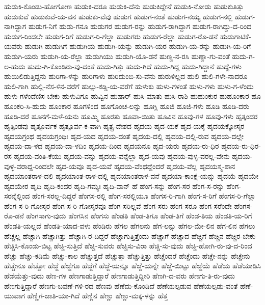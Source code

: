 ಹುಡುಕಿ-ಕೊಂಡು-ಹೋಗೋಣ
ಹುಡುಕಿ-ದರೂ
ಹುಡುಕಿ-ದೆನು
ಹುಡುಕಿದ್ದೇನೆ
ಹುಡುಕಿ-ನೋಡು
ಹುಡುಕುತಿತ್ತು
ಹುಡುಕುವೆ
ಹುಡುಕುವೆ-ಯ-ವನ
ಹುಡುಕು-ವೆವು
ಹುಡುಗ
ಹುಡುಗ-ನಂತೆ
ಹುಡುಗ-ನಯ್ಯ
ಹುಡುಗ-ನಲ್ಲಿ
ಹುಡುಗ-ನಾಗಿದ್ದಾಗ
ಹುಡುಗ-ನಿಗೆ
ಹುಡು-ಗನೂ
ಹುಡುಗರ
ಹುಡುಗ-ರನ್ನು
ಹುಡುಗ-ರಾಗಿದ್ದಾಗ
ಹುಡುಗ-ರಾಗಿದ್ದು-ದ-ರಿಂದ
ಹುಡುಗ-ರಿಂದಲೇ
ಹುಡುಗ-ರಿಗೆ
ಹುಡುಗ-ರಿ-ಗೆಲ್ಲಾ
ಹುಡುಗರು
ಹುಡುಗ-ರೆಲ್ಲಾ
ಹುಡುಗ-ರೊ-ಡನೆ
ಹುಡುಗಾಟಿಕೆ-ಯವರು
ಹುಡುಗಿ
ಹುಡುಗಿಗೆ
ಹುಡುಗಿಯ
ಹುಡುಗಿ-ಯನ್ನು
ಹುಡುಗಿ-ಯರ
ಹುಡುಗಿ-ಯ-ರನ್ನು
ಹುಡುಗಿ-ಯ-ರಿಗೆ
ಹುಡುಗಿ-ಯರು
ಹುಡುಗಿ-ಯ-ರೆಲ್ಲಾ
ಹುಡುಗಿಯು
ಹುಡುಗಿ-ಯೊ-ಡನೆ
ಹುಣ್ಣ-ನ-ರಸಿ
ಹುಣ್ಣಾ-ಗು-ವಂತೆ
ಹುದು-ಗ-ಲ-ಹುದು
ಹುದು-ಗಿ-ಕೊಂಡಿರು-ವು-ದಂತೆ
ಹುದು-ಗಿತ್ತು
ಹುದು-ಗಿದೆ
ಹುದು-ಗಿದ್ದ
ಹುದು-ಗಿದ್ದಾನೆ
ಹುದ್ದೆ-ಗಳು
ಹುಯಿಲಿಡುತ್ತಿದ್ದನು
ಹುರಿಗಾ-ಳನ್ನು
ಹುರಿಗಾಳು
ಹುರಿದುಂಬಿ-ಸು-ವೆನು
ಹುರುಳಿಲ್ಲದ
ಹುಲಿ
ಹುಲಿ-ಗಳೇ-ನಾದರೂ
ಹುಲಿ-ಗಾಗಿ
ಹುಲ್ಲಿ-ನೆಸ-ಳಿನ-ವರೆಗೆ
ಹುಲ್ಲು-ಕಡ್ಡಿ-ಯ-ವರೆಗೆ
ಹುಳುಕು
ಹುಳು-ಗಳಂತೆ
ಹುಳು-ಗಳು
ಹುಳು-ಗ-ಳೆಂದು
ಹುಳು-ಗಳೆಂದೆಣಿಸ-ಬೇಕು
ಹುಳುವಿಗೂ
ಹುವ್ವಿನ
ಹುಷಾರ್
ಹುಸಿ-ಮಾತು
ಹುಸಿ-ರಾಶಿ
ಹುಹುಂಕುರ
ಹುಹೂಂಕಾರ
ಹೂ
ಹೂಂಕರಿ-ಸಿ-ಹುದು
ಹೂಂಕಾರ
ಹೂಗಳಿಂದ
ಹೂಗೊಂಚ-ಲನ್ನು
ಹೂಗ್ಲಿ
ಹೂಜಿ
ಹೂಜಿ-ಗಳು
ಹೂಡಿ
ಹೂಡಿ-ದರು
ಹೂಡಿ-ದರೆ
ಹೂನಗೆ-ಮಳೆ-ಯನು
ಹೂಮ್ಮಿ
ಹೂರತು
ಹೂವಾ-ಯಿತು
ಹೂವಿನ
ಹೂವು-ಗಳ
ಹೂವು-ಗಳು
ಹೃತ್ಕಂದರ
ಹೃತ್ಪಿಂಡವು
ಹೃತ್ಪೂರ್ವಕ
ಹೃತ್ಪೂರ್ವ-ಕ-ವಾಗಿ
ಹೃತ್ಪ್ರ-ದೇಶದ
ಹೃದಯ
ಹೃದ-ಯಕೆ
ಹೃದ-ಯಕ್ಕೆ
ಹೃದಯಕ್ಕೋಸ್ಕರ
ಹೃದಯಗ್ರಂಥ
ಹೃದಯಗ್ರಂಥಿಃ
ಹೃದ-ಯದ
ಹೃದಯ-ದಂತೆ
ಹೃದಯ-ದಲ್ಲಿ
ಹೃದಯ-ದಲ್ಲಿ-ರುವ
ಹೃದಯ-ದಲ್ಲೇ
ಹೃದಯ-ದಾ-ಳದ
ಹೃದಯ-ದಾ-ಳದಿಂ
ಹೃದಯ-ದಿಂದ
ಹೃದಯನೂ
ಹೃದ-ಯರು
ಹೃದಯ-ರು-ಧಿರ
ಹೃದಯ-ರು-ಧಿರ-ರಸ
ಹೃದಯ-ವಂತಿ-ಕೆಯು
ಹೃದಯ-ವನ್ನು
ಹೃದಯ-ವನ್ನೆಲ್ಲಾ
ಹೃದ-ಯವು
ಹೃದಯ-ವುಳ್ಳ-ವರಲ್ಲ-ವೇನು
ಹೃದಯ-ವುಳ್ಳ-ವರಾದ್ದ-ರಿಂದಲೇ
ಹೃದ-ಯವೂ
ಹೃದ-ಯವೆ
ಹೃದಯ-ವೆಂಥದ್ದೆಂದರೆ
ಹೃದಯ-ವೆಲ್ಲ
ಹೃದಯಸ್ಮ-ಶಾನ
ಹೃದಯಾಂತರಾಳ-ದಲಿ
ಹೃದಯಾಂತ-ರಾಳ-ದಲ್ಲಿ
ಹೃದಯಾಂತರಾಳ-ವನೆ
ಹೃದಯಾ-ಕಾಂಕ್ಷೆ-ಯನ್ನು
ಹೃದಯೆ
ಹೃದಯೇ
ಹೃದಯೇರ
ಹೃದಿ
ಹೃದಿ-ಕಂದರ
ಹೃದಿ-ಗಮ್ಯಃ
ಹೃದಿ-ವಾನ್
ಹೆ
ಹೆಂಗ-ಸನ್ನು
ಹೆಂಗ-ಸರ
ಹೆಂಗ-ಸ-ರನ್ನು
ಹೆಂಗ-ಸರನ್ನೆಲ್ಲಿಂದ
ಹೆಂಗ-ಸರಲ್ಲ-ದಿದ್ದರೆ
ಹೆಂಗಸ-ರಲ್ಲಿ
ಹೆಂಗ-ಸರಲ್ಲಿಯೂ
ಹೆಂಗಸ-ರಿ-ಗಾಗಿ
ಹೆಂಗ-ಸ-ರಿಗೆ
ಹೆಂಗಸ-ರಿ-ಗೆಲ್ಲಾ
ಹೆಂಗ-ಸ-ರಿ-ಗೋಸ್ಕರ
ಹೆಂಗ-ಸ-ರಿ-ಗೋಸ್ಕರವೂ
ಹೆಂಗ-ಸರಿಲ್ಲವೆ
ಹೆಂಗ-ಸರು
ಹೆಂಗ-ಸರೂ
ಹೆಂಗ-ಸರೆಂದೇ
ಹೆಂಗಸ-ರೊ-ಡನೆ
ಹೆಂಗಸಾಗು-ವುದು
ಹೆಂಗಸಿನ
ಹೆಂಗಸು
ಹೆಂಡತಿ
ಹೆಂಡ-ತಿಗೂ
ಹೆಂಡ-ತಿಗೆ
ಹೆಂಡ-ತಿಯ
ಹೆಂಡತಿ-ಯ-ರಿಗೆ
ಹೆಂಡತಿ-ಯಲ್ಲದೆ
ಹೆಂಡತಿ-ಯಾದ-ವಳು
ಹೆಂಡಿರು
ಹೆಗಲ
ಹೆಗಲನು
ಹೆಗ-ಲನ್ನು
ಹೆಗಲ-ಮೇ-ಲಿನ
ಹೆಗ-ಲಿನ
ಹೆಗಲು
ಹೆಚ್ಚಲ್ಲ
ಹೆಚ್ಚಾಗಿ
ಹೆಚ್ಚಾಗಿತ್ತು
ಹೆಚ್ಚಾಗಿ-ರ-ದಿದ್ದರೆ
ಹೆಚ್ಚಾಗುತ್ತಿತ್ತೆಂದು
ಹೆಚ್ಚಾಗೆ
ಹೆಚ್ಚಾದ
ಹೆಚ್ಚಿಗೆ
ಹೆಚ್ಚಿನ
ಹೆಚ್ಚಿರ-ಬೇಕು
ಹೆಚ್ಚಿಸಿ-ಕೊಂಡು-ಬಿಟ್ಟ
ಹೆಚ್ಚಿ-ಸುತ್ತಿದೆ
ಹೆಚ್ಚಿ-ಸುವರು
ಹೆಚ್ಚಿಸು-ವಿರಾ
ಹೆಚ್ಚಿ-ಸು-ವುದು
ಹೆಚ್ಚಿ-ಹೋಗಿ-ರು-ವು-ದ-ರಿಂದ
ಹೆಚ್ಚು
ಹೆಚ್ಚು-ಕಡಿಮೆ
ಹೆಚ್ಚು-ಕಾಲ
ಹೆಚ್ಚುತ್ತದೆ
ಹೆಚ್ಚುತ್ತಾ
ಹೆಚ್ಚುತ್ತಿತ್ತು
ಹೆಚ್ಚೆಂದರೆ
ಹೆಚ್ಚೆಂದು
ಹೆಚ್ಚೇ-ನನ್ನು
ಹೆಚ್ಚೇನು
ಹೆಚ್ಚೇನೂ
ಹೆಚ್ಚೋ
ಹೆಜ್ಜೆ
ಹೆಜ್ಜೆಗೂ
ಹೆಜ್ಜೆಗೆ
ಹೆಜ್ಜೆ-ಯನ್ನೂ
ಹೆಜ್ಜೆ-ಯನ್ನೇ
ಹೆಜ್ಜೆ-ಯಿಟ್ಟು
ಹೆಜ್ಜೆಯೆ
ಹೆಡೆಯ
ಹೆಡೆಯಾಡಿಸಿ
ಹೆಡೆಯೆತ್ತು-ವುದು
ಹೆಣ-ಗಳ
ಹೆಣಗಾಡುತ್ತಿದ್ದಾರೆ
ಹೆಣಗಾಡುತ್ತಿದ್ದೀರಿ
ಹೆಣಗಿ-ದ-ವರು
ಹೆಣಗು-ತಿ-ರು-ವುದು
ಹೆಣಗುತ್ತಿದ್ದಾರೆ
ಹೆಣಗು-ಬವಣೆ-ಗಳಿ-ರದ
ಹೆಣವು
ಹೆಣೆದು-ಕೊಂಡಿದೆ
ಹೆಣೆಯಲ್ಪಡುವ
ಹೆಣೆಯಲ್ಪಡು-ವಂತೆ
ಹೆಣೆ-ಯುವಾಗ
ಹೆಣ್ಣಿಗ-ಜಾತಿ-ಯಾ-ಗಿದೆ
ಹೆಣ್ಣಿನ
ಹೆಣ್ಣು
ಹೆಣ್ಣು-ಮಕ್ಕ-ಳನ್ನು
ಹೆತ್ತ
